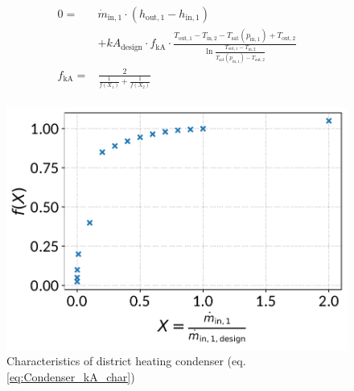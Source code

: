 \documentclass[]{article}
\begin{document}
\begin{equation}
\label{eq:Condenser_kA_char}
\begin{split}
0 = & \dot{m}_\mathrm{in,1} \cdot \left( h_\mathrm{out,1} - h_\mathrm{in,1}\right)\\
&+kA_\mathrm{design} \cdot f_\mathrm{kA} \cdot \frac{T_\mathrm{out,1} - T_\mathrm{in,2} - T_\mathrm{sat}\left( p_\mathrm{in,1}\right) +T_\mathrm{out,2}}{\ln{\frac{T_\mathrm{out,1}-T_\mathrm{in,2}}{T_\mathrm{sat}\left( p_\mathrm{in,1}\right)- T_\mathrm{out,2}}}}\\
f_\mathrm{kA}=&\frac{2}{\frac{1}{f\left(X_1\right)}+\frac{1}{f\left(X_2\right)}}\\
\end{split}
\end{equation}

\begin{minipage}{0.5\textwidth}
\begin{figure}[H]\begin{center}
\includegraphics[width=\textwidth]{figures/Condenser_CharLine_kA_char1_district_heating_condenser.pdf}
\caption{Characteristics of district heating condenser (eq. \ref{eq:Condenser_kA_char})}
\label{fig:CharLine_kA_char1_district heating condenser}
\end{center}\end{figure}

\end{minipage}
\end{document}
